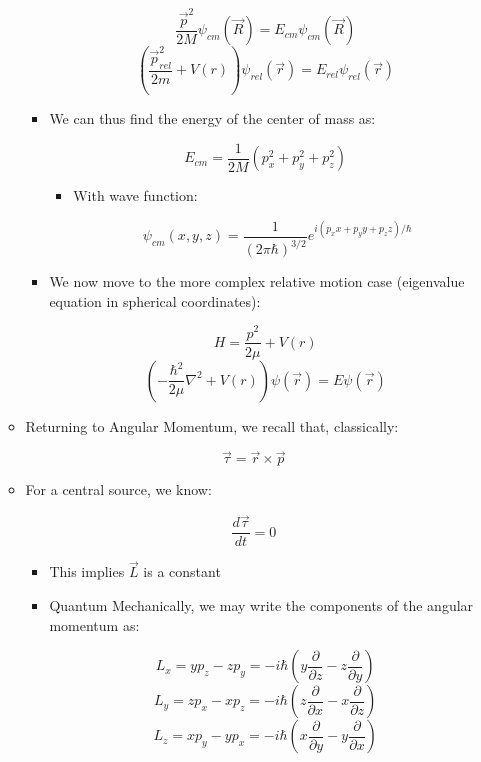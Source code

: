 \begin{itemize}
\begin{itemize}
\begin{itemize}
              $$\frac{\vec{p}^2}{2M}\psi_{cm}(\vec{R})=E_{cm}\psi_{cm}(\vec{R})$$
              $$\left(\frac{\vec{p}_{rel}^2}{2m}+V(r)\right)\psi_{rel}(\vec{r})=E_{rel}\psi_{rel}(\vec{r})$$

            \item We can thus find the energy of the center of mass as:

              $$E_{cm}=\frac{1}{2M}\left( p_x^2+p_y^2+p_z^2 \right)$$

              \begin{itemize}

                \item With wave function:

                  $$\psi_{cm}(x,y,z)=\frac{1}{(2\pi\hbar)^{3/2}}e^{i(p_xx+p_yy+p_zz)/\hbar}$$

              \end{itemize}

            \item We now move to the more complex relative motion case (eigenvalue equation in spherical coordinates):

              $$H=\frac{p^2}{2\mu}+V(r)$$
              $$\left( -\frac{\hbar^2}{2\mu}\nabla^2+V(r) \right)\psi(\vec{r})=E\psi(\vec{r})$$

        \end{itemize}

      \item Returning to Angular Momentum, we recall that, classically:

        $$\vec{\tau}=\vec{r}\times\vec{p}$$

      \item For a central source, we know:

        $$\frac{d\vec{\tau}}{dt}=0$$

        \begin{itemize}

          \item This implies $\vec{L}$ is a constant

          \item Quantum Mechanically, we may write the components of the angular momentum as:

            $$L_x=yp_z-zp_y=-i\hbar\left( y\frac{\partial}{\partial z}-z\frac{\partial}{\partial y} \right)$$
            $$L_y=zp_x-xp_z=-i\hbar\left( z\frac{\partial}{\partial x}-x\frac{\partial}{\partial z} \right)$$
            $$L_z=xp_y-yp_x=-i\hbar\left( x\frac{\partial}{\partial y}-y\frac{\partial}{\partial x} \right)$$


\end{itemize}
\end{itemize}
\end{itemize}
